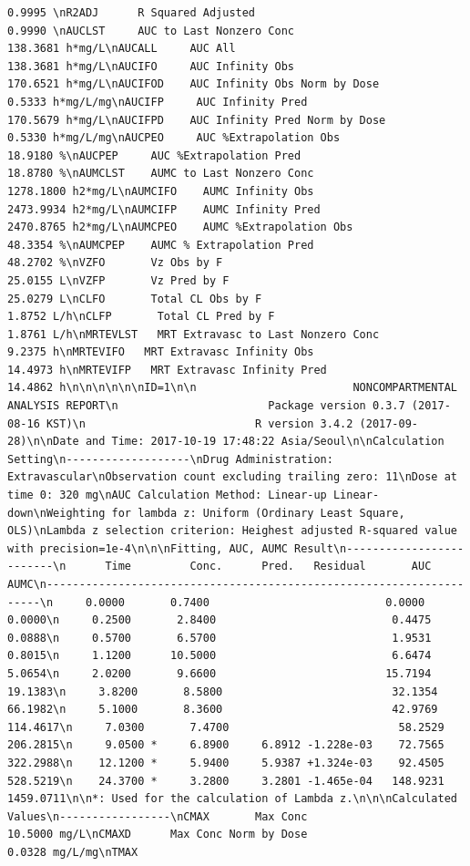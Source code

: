 \documentclass[]{krantz}
\theoremstyle{definition}
\theoremstyle{definition}
\theoremstyle{definition}
\theoremstyle{remark}
\begin{document}
\begin{verbatim}
0.9995 \nR2ADJ      R Squared Adjusted                              0.9990 \nAUCLST     AUC to Last Nonzero Conc                      138.3681 h*mg/L\nAUCALL     AUC All                                       138.3681 h*mg/L\nAUCIFO     AUC Infinity Obs                              170.6521 h*mg/L\nAUCIFOD    AUC Infinity Obs Norm by Dose                   0.5333 h*mg/L/mg\nAUCIFP     AUC Infinity Pred                             170.5679 h*mg/L\nAUCIFPD    AUC Infinity Pred Norm by Dose                  0.5330 h*mg/L/mg\nAUCPEO     AUC %Extrapolation Obs                         18.9180 %\nAUCPEP     AUC %Extrapolation Pred                        18.8780 %\nAUMCLST    AUMC to Last Nonzero Conc                    1278.1800 h2*mg/L\nAUMCIFO    AUMC Infinity Obs                            2473.9934 h2*mg/L\nAUMCIFP    AUMC Infinity Pred                           2470.8765 h2*mg/L\nAUMCPEO    AUMC %Extrapolation Obs                        48.3354 %\nAUMCPEP    AUMC % Extrapolation Pred                      48.2702 %\nVZFO       Vz Obs by F                                    25.0155 L\nVZFP       Vz Pred by F                                   25.0279 L\nCLFO       Total CL Obs by F                               1.8752 L/h\nCLFP       Total CL Pred by F                              1.8761 L/h\nMRTEVLST   MRT Extravasc to Last Nonzero Conc              9.2375 h\nMRTEVIFO   MRT Extravasc Infinity Obs                     14.4973 h\nMRTEVIFP   MRT Extravasc Infinity Pred                    14.4862 h\n\n\n\n\n\nID=1\n\n                        NONCOMPARTMENTAL ANALYSIS REPORT\n                       Package version 0.3.7 (2017-08-16 KST)\n                          R version 3.4.2 (2017-09-28)\n\nDate and Time: 2017-10-19 17:48:22 Asia/Seoul\n\nCalculation Setting\n-------------------\nDrug Administration: Extravascular\nObservation count excluding trailing zero: 11\nDose at time 0: 320 mg\nAUC Calculation Method: Linear-up Linear-down\nWeighting for lambda z: Uniform (Ordinary Least Square, OLS)\nLambda z selection criterion: Heighest adjusted R-squared value with precision=1e-4\n\n\nFitting, AUC, AUMC Result\n-------------------------\n      Time         Conc.      Pred.   Residual       AUC       AUMC\n---------------------------------------------------------------------\n     0.0000       0.7400                           0.0000     0.0000\n     0.2500       2.8400                           0.4475     0.0888\n     0.5700       6.5700                           1.9531     0.8015\n     1.1200      10.5000                           6.6474     5.0654\n     2.0200       9.6600                          15.7194    19.1383\n     3.8200       8.5800                          32.1354    66.1982\n     5.1000       8.3600                          42.9769   114.4617\n     7.0300       7.4700                          58.2529   206.2815\n     9.0500 *     6.8900     6.8912 -1.228e-03    72.7565   322.2988\n    12.1200 *     5.9400     5.9387 +1.324e-03    92.4505   528.5219\n    24.3700 *     3.2800     3.2801 -1.465e-04   148.9231  1459.0711\n\n*: Used for the calculation of Lambda z.\n\n\nCalculated Values\n-----------------\nCMAX       Max Conc                                       10.5000 mg/L\nCMAXD      Max Conc Norm by Dose                           0.0328 mg/L/mg\nTMAX       
\end{verbatim}
\end{document}
